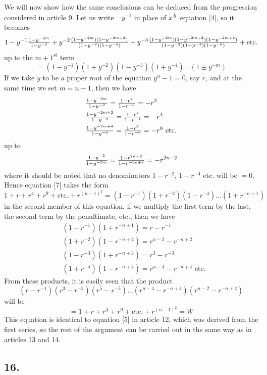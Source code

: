 \documentclass[twoside,12pt]{memoir}
\let\oldfrac\frac
\def\frac#1#2{\mathchoice{\tfrac{#1}{#2}}{\oldfrac{#1}{#2}}{\genfrac{}{}{}{2}{#1}{#2\mathstrut}}{\genfrac{}{}{}{3}{#1}{#2\mathstrut}}}
\begin{document}
We will now show how the same conclusions can be deduced from the progression considered in article 9. Let us write \(-y^{-1}\) in place of \(x^{\frac{1}{2}}\) equation [4], so it becomes\pagebreak%
\[1-y^{-1} \frac{1-y^{-2 m}}{1-y^{-2}}+y^{-2} \frac{(1-y^{-2 m})(1-y^{-2 m+2})}{(1-y^{-2})(1-y^{-4})}-y^{-3} \frac{(1-y^{-2 m})(1-y^{-2 m+2})(1-y^{-2 m+2})}{(1-y^{-2})(1-y^{-4})(1-y^{-6})}+\text{etc{.}}\]
up to the \(m+1^{\text{st}}\) term
\[=(1-y^{-1})(1+y^{-2})(1-y^{-3})(1+y^{-4}) \ldots(1 \pm y^{-m})\tag{7}\]
If we take \(y\) to be a proper root of the equation \(y^{n}-1=0\), say \(r\), and at the same time we set \(m=n-1\), then we have
\[\begin{aligned}
& \frac{1-y^{-2 m}}{1-y^{-2}}=\frac{1-r^{2}}{1-r^{-2}}=-r^{2} \\
& \frac{1-y^{-2 m+2}}{1-y^{-4}}=\frac{1-r^{4}}{1-r^{-4}}=-r^{4} \\
& \frac{1-y^{-2 m+4}}{1-y^{-6}}=\frac{1-r^{6}}{1-r^{-6}}=-r^{6} \text{ etc{.}}
\end{aligned}\]
up to
\[\frac{1-y^{-2}}{1-y^{-2 m}}=\frac{1-r^{2 n-2}}{1-r^{-2 n+2}}=-r^{2 n-2}\]
where it should be noted that no denominators \(1-r^{-2}\), \(1-r^{-4}\) etc{.} will be \(=0\). Hence equation [7] takes the form
\[1+r+r^{4}+r^{9}+\text{etc{.}}+r^{(n-1)^{2}}=(1-r^{-1})(1+r^{-2})(1-r^{-3}) \ldots(1+r^{-n+1})\]
in the second member of this equation, if we multiply the first term by the last, the second term by the penultimate, etc{.}, then we have
\[\begin{aligned}
& (1-r^{-1})(1+r^{-n+1})=r-r^{-1} \\
& (1+r^{-2})(1-r^{-n+2})=r^{n-2}-r^{-n+2} \\
& (1-r^{-3})(1+r^{-n+3})=r^{3}-r^{-3} \\
& (1+r^{-4})(1-r^{-n+4})=r^{n-4}-r^{-n+4} \text{ etc{.}}
\end{aligned}\]
From these products, it is easily seen that the product
\[(r-r^{-1})(r^{3}-r^{-3})(r^{5}-r^{-5}) \ldots(r^{n-4}-r^{-n+4})(r^{n-2}-r^{-n+2})\]
will be
\[=1+r+r^{4}+r^{9}+\text{etc{.}}+r^{(n-1)^{2}}=W\]
This equation is identical to equation [5] in article 12, which was derived from the first series, so the rest of the argument can be carried out in the same way as in articles 13 and 14.\pagebreak%

\subsection*{16.}
\end{document}
